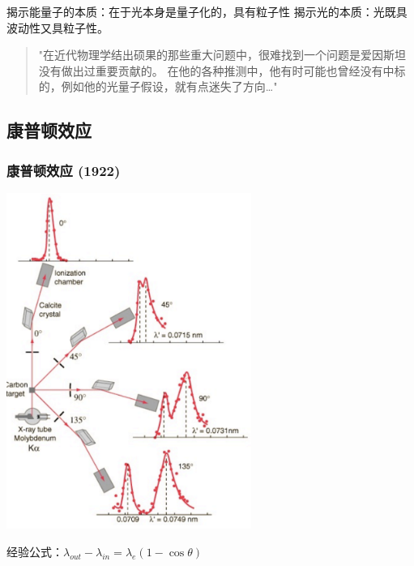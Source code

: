 \begin{frame} 
    \begin{tcolorbox4}[光量子假说的意义]
        \begin{itemize}
            \Item  揭示能量子的本质：在于光本身是量子化的，具有粒子性
            \Item  揭示光的本质：光既具波动性又具粒子性。
        \end{itemize}
    \end{tcolorbox4}
    \begin{quotation}
        "在近代物理学结出硕果的那些重大问题中，很难找到一个问题是爱因斯坦没有做出过重要贡献的。
        在他的各种推测中，他有时可能也曾经没有中标的，例如他的光量子假设，就有点迷失了方向\dots"  \\
    \end{quotation}
\end{frame}

\subsection{康普顿效应}

\begin{frame}   
    \frametitle{康普顿效应 (1922)}
    \begin{center}
        \includegraphics[width=0.6\textwidth]{figs/comptonscattering.png}
    \end{center}  
    经验公式：$\lambda_{out}-\lambda_{in}=\lambda_e(1-\cos \theta)$
\end{frame}


